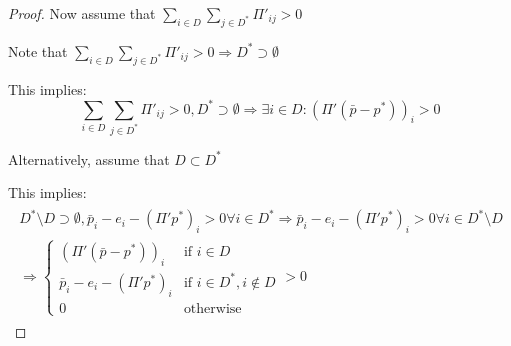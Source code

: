 \documentclass[12pt,a4paper]{article}
\begin{document}
\begin{proof}
Now assume that $\sum_{i\in D}\sum_{j\in D^*}\Pi'_{ij} >0$

Note that $\sum_{i\in D}\sum_{j\in D^*}\Pi'_{ij} >0 \Rightarrow  D^* \supset \emptyset$

This implies: 
\[
\sum_{i\in D}\sum_{j\in D^*}\Pi'_{ij} >0,D^* \supset \emptyset \Rightarrow \exists i\in D \colon(\Pi' (\bar{p}-p^* ))_i>0
\]

Alternatively, assume that $D\subset D^*$

This implies: 
\begin{align*}
\begin{split}
D^*\setminus D \supset \emptyset,\bar{p}_i-e_i-(\Pi' p^* )_i>0 \forall i \in D^* \Rightarrow \bar{p}_i-e_i-(\Pi' p^* )_i>0 \forall i \in D^*\setminus D \\ \Rightarrow
\begin{cases}
(\Pi' (\bar{p}-p^* ))_i  &\mbox{if } i \in D \\
\bar{p}_i-e_i-(\Pi' p^* )_i  &\mbox{if } i\in D^*,i \notin D \\
0 &\mbox{otherwise}
\end{cases}
>0
\end{split}
\end{align*}

\end{proof}
\end{document}

